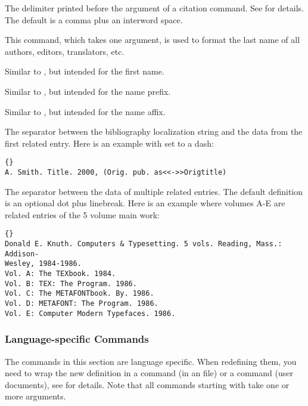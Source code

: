 \documentclass{ltxdockit}[2011/03/25]
\begin{document}
\begin{ltxsyntax}
The delimiter printed before the  argument of a citation command. See  for details. The default is a comma plus an interword space.

This command, which takes one argument, is used to format the last name of all authors, editors, translators, etc.

Similar to , but intended for the first name.

Similar to , but intended for the name prefix.

Similar to , but intended for the name affix.

The separator between the  bibliography localization string and the data from the first related entry. Here is an example with  set to a dash:

\begin{lstlisting}[style=latex]{}
A. Smith. Title. 2000, (Orig. pub. as<<->>Origtitle)
\end{lstlisting}

The separator between the data of multiple related entries. The default definition is an optional dot plus linebreak. Here is an example where volumes A-E are related entries of the 5 volume main work:

\begin{lstlisting}[style=latex]{}
Donald E. Knuth. Computers & Typesetting. 5 vols. Reading, Mass.: Addison-
Wesley, 1984-1986.
Vol. A: The TEXbook. 1984.
Vol. B: TEX: The Program. 1986.
Vol. C: The METAFONTbook. By. 1986.
Vol. D: METAFONT: The Program. 1986.
Vol. E: Computer Modern Typefaces. 1986.
\end{lstlisting}

\end{ltxsyntax}

\subsubsection{Language-specific Commands}
\label{use:fmt:lng}

The commands in this section are language specific. When redefining them, you need to wrap the new definition in a  command (in an  file) or a  command (user documents), see  for details. Note that all commands starting with  take one or more arguments.
\end{document}
